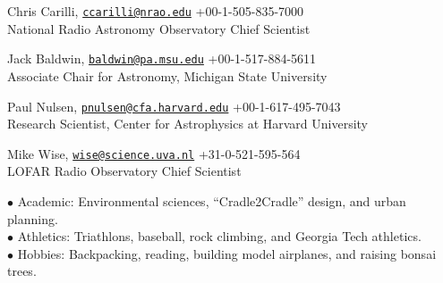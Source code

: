 \documentclass[12pt]{cv}
\begin{document}
\begin{llist}
Chris Carilli, \href{mailto:ccarilli@nrao.edu}{\tt ccarilli@nrao.edu} \hfill +00-1-505-835-7000\\
National Radio Astronomy Observatory Chief Scientist

Jack Baldwin, \href{mailto:baldwin@pa.msu.edu}{\tt baldwin@pa.msu.edu} \hfill +00-1-517-884-5611\\
Associate Chair for Astronomy, Michigan State University

Paul Nulsen, \href{mailto:pnulsen@cfa.harvard.edu}{\tt pnulsen@cfa.harvard.edu} \hfill +00-1-617-495-7043\\
Research Scientist, Center for Astrophysics at Harvard University

Mike Wise, \href{mailto:wise@science.uva.nl}{\tt wise@science.uva.nl} \hfill +31-0-521-595-564\\
LOFAR Radio Observatory Chief Scientist


$\bullet$ Academic: Environmental sciences, ``Cradle2Cradle'' design, and urban planning.\\
$\bullet$ Athletics: Triathlons, baseball, rock climbing, and Georgia Tech athletics.\\
$\bullet$ Hobbies: Backpacking, reading, building model airplanes, and raising bonsai trees.

\end{llist}
\end{document}

